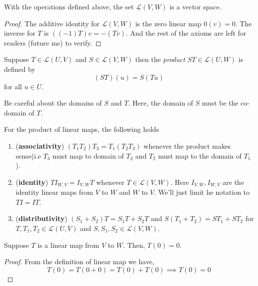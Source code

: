 \begin{proposition}
    With the operations defined above, the set $\mathcal{L}(V,W)$ is a vector space.
\end{proposition}

\begin{proof}
    The additive identity for $\mathcal{L}(V,W)$ is the zero linear map $0(v)=0$. The inverse for $T$ is $((-1)T)v= -(Tv)$. And the 
    rest of the axioms are left for readers (future me) to verify.
\end{proof}

\begin{definition}
    Suppose $T \in \mathcal{L}(U,V)$ and $S \in \mathcal{L}(V,W)$ then the \textit{product} $ST \in \mathcal{L}(U,W)$ is defined by
    \[ (ST)(u) = S(Tu) \] 
    for all $u \in U$.
\end{definition}

\begin{remark}
    Be careful about the domains of $S$ and $T$. Here, the domain of $S$ must be the co-domain of $T$.
\end{remark}

\begin{proposition}
    For the product of linear maps, the following holds
    \begin{enumerate}
        \item (\textbf{associativity}) $(T_1 T_2) T_3 = T_1(T_2 T_3)$ whenever the product makes sense(i.e $T_3$ must map to domain of 
        $T_2$ and $T_2$ must map to the domain of $T_1$).
        \item (\textbf{identity}) $TI_{W,V} = I_{V,W}T$ whenever $T \in \mathcal{L}(V,W)$. Here $I_{V,W}, I_{W,V}$ are the identity linear maps
        from $V$ to $W$ and $W$ to $V$. We'll just limit he notation to $TI=IT$.
        \item (\textbf{distributivity}) $(S_1 + S_2)T=S_1 T + S_2 T$ and $S(T_1 + T_2)=ST_1 + ST_2$ for $T,T_1,T_2 \in \mathcal{L}(U,V)$ and 
        $S,S_1,S_2 \in \mathcal{L}(V,W)$.
    \end{enumerate}
\end{proposition}

\begin{proposition}
    Suppose $T$ is a linear map from $V$ to $W$. Then, $T(0)=0$.
\end{proposition}

\begin{proof}
    From the definition of linear map we have,
    \[ T(0)=T(0+0)=T(0)+T(0) \implies T(0)=0 \]
\end{proof}

